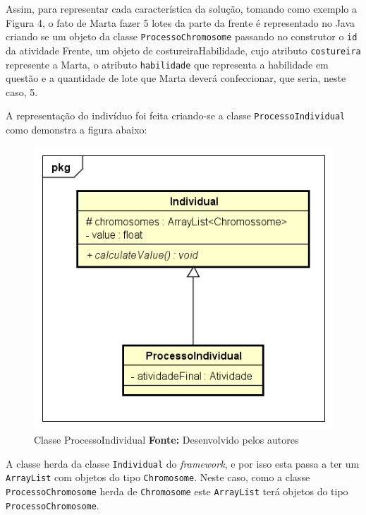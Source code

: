  \par Assim, para representar cada característica da solução, tomando como exemplo a Figura 4, 
o fato de Marta fazer 5 lotes da parte da frente é representado no Java criando se um objeto da classe \texttt{ProcessoChromosome}
passando no construtor o \texttt{id} da atividade Frente, um objeto de costureiraHabilidade, cujo atributo \texttt{costureira} represente
a Marta, o atributo \texttt{habilidade} que representa a habilidade em questão e a quantidade de lote que Marta deverá confeccionar, que seria, neste caso, 5.

\par A representação do indivíduo foi feita criando-se a classe \texttt{ProcessoIndividual} como demonstra a figura abaixo:


\begin{figure}[h!]
	\centerline{\includegraphics[scale=0.9]{./imagens/class_individual.png}}
	\caption[Classe CostureiraHabilidade]
	{Classe ProcessoIndividual \textbf{Fonte:} Desenvolvido pelos autores}
	\label{fig:exemplo1}
\end{figure}

\par A classe herda da classe \texttt{Individual} do \textit{framework}, e por isso
esta passa a ter um \texttt{ArrayList} com objetos do tipo \texttt{Chromosome}. Neste caso, como a classe
\texttt{ProcessoChromosome} herda de \texttt{Chromosome} este \texttt{ArrayList} terá objetos do tipo 
\texttt{ProcessoChromosome}.

